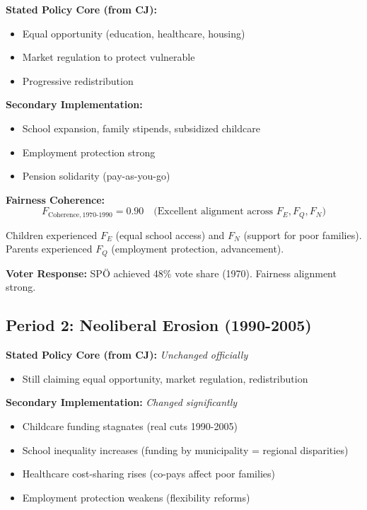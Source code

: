 \textbf{Stated Policy Core (from CJ):}
\begin{itemize}[nosep]
\item Equal opportunity (education, healthcare, housing)
\item Market regulation to protect vulnerable
\item Progressive redistribution
\end{itemize}

\textbf{Secondary Implementation:}
\begin{itemize}[nosep]
\item School expansion, family stipends, subsidized childcare
\item Employment protection strong
\item Pension solidarity (pay-as-you-go)
\end{itemize}

\textbf{Fairness Coherence:}
\begin{equation}
F_{\text{Coherence}, 1970\text{-}1990} = 0.90 \quad \text{(Excellent alignment across } F_E, F_Q, F_N\text{)}
\end{equation}

Children experienced $F_E$ (equal school access) and $F_N$ (support for poor families).
Parents experienced $F_Q$ (employment protection, advancement).

\textbf{Voter Response:} SPÖ achieved 48\% vote share (1970). Fairness alignment strong.

\subsection{Period 2: Neoliberal Erosion (1990-2005)}

\textbf{Stated Policy Core (from CJ):} \textit{Unchanged officially}
\begin{itemize}[nosep]
\item Still claiming equal opportunity, market regulation, redistribution
\end{itemize}

\textbf{Secondary Implementation:} \textit{Changed significantly}
\begin{itemize}[nosep]
\item Childcare funding stagnates (real cuts 1990-2005)
\item School inequality increases (funding by municipality = regional disparities)
\item Healthcare cost-sharing rises (co-pays affect poor families)
\item Employment protection weakens (flexibility reforms)
\end{itemize}

